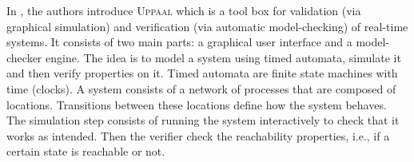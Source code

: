 \documentclass[a4paper,twoside]{article}
\def\sysml{\textsc{SysML}}
\def\uml{\textsc{Uml}}
\def\uppaal{\textsc{Uppaal}}
\begin{document}

In \cite{test12}, the authors introduce \uppaal{} which is a tool box for validation (via graphical simulation) and verification (via automatic model-checking) of real-time systems. It consists of two main parts: a graphical user interface and a model-checker engine. The idea is to model a system using timed automata, simulate it and then verify properties on it. Timed automata are finite state machines with time (clocks). A system consists of a network of processes that are composed of locations. Transitions between these locations define how the system behaves. The simulation step consists of running the system interactively to check that it works as intended. Then the verifier check the reachability properties, i.e., if a certain state is reachable or not. 




\end{document}
